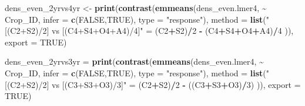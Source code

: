 \documentclass[
]{article}
\newenvironment{Shaded}{\begin{snugshade}}{\end{snugshade}}
\newcommand{\AttributeTok}[1]{\textcolor[rgb]{0.13,0.29,0.53}{#1}}
\newcommand{\ConstantTok}[1]{\textcolor[rgb]{0.56,0.35,0.01}{#1}}
\newcommand{\DecValTok}[1]{\textcolor[rgb]{0.00,0.00,0.81}{#1}}
\newcommand{\FunctionTok}[1]{\textcolor[rgb]{0.13,0.29,0.53}{\textbf{#1}}}
\newcommand{\NormalTok}[1]{#1}
\newcommand{\OtherTok}[1]{\textcolor[rgb]{0.56,0.35,0.01}{#1}}
\newcommand{\SpecialCharTok}[1]{\textcolor[rgb]{0.81,0.36,0.00}{\textbf{#1}}}
\newcommand{\StringTok}[1]{\textcolor[rgb]{0.31,0.60,0.02}{#1}}
\begin{document}
\begin{Shaded}
\begin{Highlighting}[]
\NormalTok{dens\_even\_2yrvs4yr }\OtherTok{\textless{}{-}} \FunctionTok{print}\NormalTok{(}\FunctionTok{contrast}\NormalTok{(}\FunctionTok{emmeans}\NormalTok{(dens\_even.lmer4, }\SpecialCharTok{\textasciitilde{}}\NormalTok{ Crop\_ID, }
                                             \AttributeTok{infer =} \FunctionTok{c}\NormalTok{(}\ConstantTok{FALSE}\NormalTok{,}\ConstantTok{TRUE}\NormalTok{), }
                                             \AttributeTok{type =} \StringTok{"response"}\NormalTok{),}
                                     \AttributeTok{method =} \FunctionTok{list}\NormalTok{(}\StringTok{"[(C2+S2)/2] vs [(C4+S4+O4+A4)/4]"} \OtherTok{=} 
\NormalTok{                                                     (C2}\SpecialCharTok{+}\NormalTok{S2)}\SpecialCharTok{/}\DecValTok{2} \SpecialCharTok{{-}}\NormalTok{ (C4}\SpecialCharTok{+}\NormalTok{S4}\SpecialCharTok{+}\NormalTok{O4}\SpecialCharTok{+}\NormalTok{A4)}\SpecialCharTok{/}\DecValTok{4}\NormalTok{ )),}
                            \AttributeTok{export =} \ConstantTok{TRUE}\NormalTok{)}


\NormalTok{dens\_even\_2yrvs3yr }\OtherTok{=} \FunctionTok{print}\NormalTok{(}\FunctionTok{contrast}\NormalTok{(}\FunctionTok{emmeans}\NormalTok{(dens\_even.lmer4, }\SpecialCharTok{\textasciitilde{}}\NormalTok{ Crop\_ID,}
                                            \AttributeTok{infer =} \FunctionTok{c}\NormalTok{(}\ConstantTok{FALSE}\NormalTok{,}\ConstantTok{TRUE}\NormalTok{), }
                                            \AttributeTok{type =} \StringTok{"response"}\NormalTok{),}
                                    \AttributeTok{method =} \FunctionTok{list}\NormalTok{(}\StringTok{"[(C2+S2)/2] vs [(C3+S3+O3)/3]"} \OtherTok{=}
\NormalTok{                                                    (C2}\SpecialCharTok{+}\NormalTok{S2)}\SpecialCharTok{/}\DecValTok{2} \SpecialCharTok{{-}}\NormalTok{ ((C3}\SpecialCharTok{+}\NormalTok{S3}\SpecialCharTok{+}\NormalTok{O3)}\SpecialCharTok{/}\DecValTok{3}\NormalTok{) )),}
                           \AttributeTok{export =} \ConstantTok{TRUE}\NormalTok{)}


\end{Highlighting}
\end{Shaded}
\end{document}

